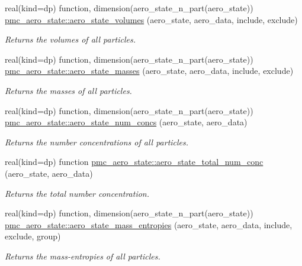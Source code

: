 \begin{DoxyCompactItemize}
real(kind=dp) function, dimension(aero\+\_\+state\+\_\+n\+\_\+part(aero\+\_\+state)) \mbox{\hyperlink{namespacepmc__aero__state_a94804b9cdd9effc574cfb0cc178f329b}{pmc\+\_\+aero\+\_\+state\+::aero\+\_\+state\+\_\+volumes}} (aero\+\_\+state, aero\+\_\+data, include, exclude)
\begin{DoxyCompactList}\small\item\em Returns the volumes of all particles. \end{DoxyCompactList}\item 
real(kind=dp) function, dimension(aero\+\_\+state\+\_\+n\+\_\+part(aero\+\_\+state)) \mbox{\hyperlink{namespacepmc__aero__state_ae9fa229a50576c4bce900bcb21c4e73c}{pmc\+\_\+aero\+\_\+state\+::aero\+\_\+state\+\_\+masses}} (aero\+\_\+state, aero\+\_\+data, include, exclude)
\begin{DoxyCompactList}\small\item\em Returns the masses of all particles. \end{DoxyCompactList}\item 
real(kind=dp) function, dimension(aero\+\_\+state\+\_\+n\+\_\+part(aero\+\_\+state)) \mbox{\hyperlink{namespacepmc__aero__state_a31dd92148979397fc0b7bc5fd056a064}{pmc\+\_\+aero\+\_\+state\+::aero\+\_\+state\+\_\+num\+\_\+concs}} (aero\+\_\+state, aero\+\_\+data)
\begin{DoxyCompactList}\small\item\em Returns the number concentrations of all particles. \end{DoxyCompactList}\item 
real(kind=dp) function \mbox{\hyperlink{namespacepmc__aero__state_a6e7b882b542eb7dd907ec490ea45c29b}{pmc\+\_\+aero\+\_\+state\+::aero\+\_\+state\+\_\+total\+\_\+num\+\_\+conc}} (aero\+\_\+state, aero\+\_\+data)
\begin{DoxyCompactList}\small\item\em Returns the total number concentration. \end{DoxyCompactList}\item 
real(kind=dp) function, dimension(aero\+\_\+state\+\_\+n\+\_\+part(aero\+\_\+state)) \mbox{\hyperlink{namespacepmc__aero__state_a0bf5046e0ca5be2e39b436d6c7b3a4cb}{pmc\+\_\+aero\+\_\+state\+::aero\+\_\+state\+\_\+mass\+\_\+entropies}} (aero\+\_\+state, aero\+\_\+data, include, exclude, group)
\begin{DoxyCompactList}\small\item\em Returns the mass-\/entropies of all particles. \end{DoxyCompactList}\item 

\end{DoxyCompactItemize}
